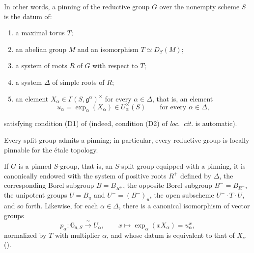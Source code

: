 In other words, a pinning of the reductive group \(G\) over the
nonempty scheme \(S\) is the datum of:
\begin{enumerate}
  \item[(i)] a maximal torus \(T\);
  \item[(ii)] an abelian group \(M\) and an isomorphism
    \(T\simeq D_S(M)\);
  \item[(iii)] a system of roots \(R\) of \(G\) with respect to \(T\);
  \item[(iv)] a system \(\Delta\) of simple roots of \(R\);
  \item[\SGAInlineRefTarget{sga3:XXIII:1.1:item:v}(v)] an element
    \(X_\alpha\in\Gamma(S,\mathfrak g^\alpha)^\times\) for every
    \(\alpha\in\Delta\), that is, an element
    \[
      u_\alpha=\exp_\alpha(X_\alpha)\in U_\alpha^\times(S)
      \qquad\text{for every }\alpha\in\Delta,
    \]
\end{enumerate}
satisfying condition (D1) of  (indeed, condition
(D2) of \textit{loc.\ cit.} is automatic).

Every split group admits a pinning; in particular, every reductive
group is locally pinnable for the étale topology.


If \(G\) is a pinned \(S\)-group, that is, an \(S\)-split group
equipped with a pinning, it is canonically endowed with the system of
positive roots \(R^+\) defined by \(\Delta\), the corresponding Borel
subgroup \(B=B_{R^+}\), the opposite Borel subgroup \(B^-=B_{R^-}\),
the unipotent groups \(U=B_u\) and \(U^-=(B^-)_{u}\), the open
subscheme \(U^-\cdot T\cdot U\), and so forth. Likewise, for each
\(\alpha\in\Delta\), there is a canonical isomorphism of vector groups
\[
  p_\alpha:\mathbb G_{a,S}\xrightarrow{\ \sim\ }U_\alpha,
  \qquad x\longmapsto \exp_\alpha(xX_\alpha)=u_\alpha^x,
\]
normalized by \(T\) with multiplier \(\alpha\), and whose datum is
equivalent to that of \(X_\alpha\) ().

